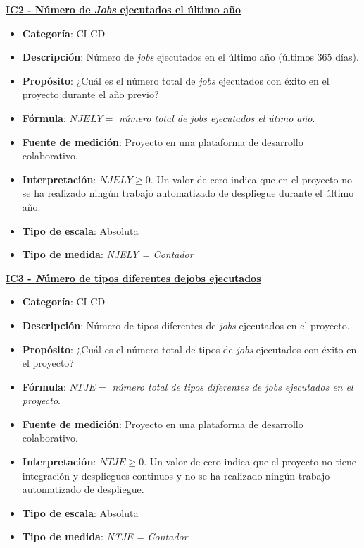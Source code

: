 \textbf{\underline{IC2 - Número de \textit{Jobs} ejecutados el último año}}
\begin{itemize}
	\item \textbf{Categoría}: CI-CD
	\item \textbf{Descripción}: Número de \textit{jobs} ejecutados en el último año (últimos 365 días).
	\item \textbf{Propósito}: ¿Cuál es el número total de \textit{jobs} ejecutados con éxito en el proyecto durante el año previo?
	\item \textbf{Fórmula}: $NJELY =$ \textit{número total de jobs ejecutados el útimo año}.
	\item \textbf{Fuente de medición}: Proyecto en una plataforma de desarrollo colaborativo.
	\item \textbf{Interpretación}: $NJELY \geq 0$. Un valor de cero indica que en el proyecto no se ha realizado ningún trabajo automatizado de despliegue durante el último año.
	\item \textbf{Tipo de escala}: Absoluta
	\item \textbf{Tipo de medida}: \textit{NJELY = Contador}
\end{itemize}

\textbf{\underline{IC3 - \textit Número de tipos diferentes de{jobs} ejecutados}}
\begin{itemize}
	\item \textbf{Categoría}: CI-CD
	\item \textbf{Descripción}: Número de tipos diferentes de \textit{jobs} ejecutados en el proyecto.
	\item \textbf{Propósito}: ¿Cuál es el número total de tipos de \textit{jobs} ejecutados con éxito en el proyecto?
	\item \textbf{Fórmula}: $NTJE =$ \textit{número total de tipos diferentes de jobs ejecutados en el proyecto}.
	\item \textbf{Fuente de medición}: Proyecto en una plataforma de desarrollo colaborativo.
	\item \textbf{Interpretación}: $NTJE \geq 0$. Un valor de cero indica que el proyecto no tiene integración y despliegues continuos y no se ha realizado ningún trabajo automatizado de despliegue.
	\item \textbf{Tipo de escala}: Absoluta
	\item \textbf{Tipo de medida}: \textit{NTJE = Contador}
\end{itemize}


